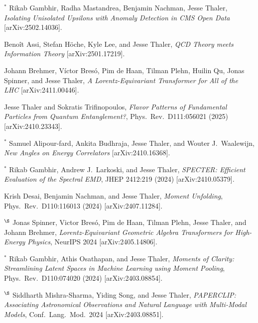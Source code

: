 \setcounter{jessecount}{137}

\begin{list}{[]\addtocounter{jessecount}{-1}}{\leftmargin=3em \itemsep=4pt}

\item
${}^\ast$ Rikab Gambhir, Radha Mastandrea, Benjamin Nachman, Jesse Thaler,
\emph{Isolating Unisolated Upsilons with Anomaly Detection in CMS Open Data}
[arXiv:2502.14036].

\item
 Benoît Assi, Stefan Höche, Kyle Lee, and Jesse Thaler,
\emph{QCD Theory meets Information Theory}
[arXiv:2501.17219].

\item
 Johann Brehmer, Víctor Bresó, Pim de Haan, Tilman Plehn, Huilin Qu, Jonas Spinner, and Jesse Thaler,
\emph{A Lorentz-Equivariant Transformer for All of the LHC}
[arXiv:2411.00446].

\item
 Jesse Thaler and Sokratis Trifinopoulos,
\emph{Flavor Patterns of Fundamental Particles from Quantum Entanglement?},
Phys.\ Rev.\ D111:056021 (2025)
[arXiv:2410.23343].

\item
${}^\ast$ Samuel Alipour-fard, Ankita Budhraja, Jesse Thaler, and Wouter J.\ Waalewijn,
\emph{New Angles on Energy Correlators}
[arXiv:2410.16368].

\item
${}^\ast$ Rikab Gambhir, Andrew J.\ Larkoski, and Jesse Thaler,
\emph{SPECTER: Efficient Evaluation of the Spectral EMD},
JHEP 2412:219 (2024)
[arXiv:2410.05379].

\item
 Krish Desai, Benjamin Nachman, and Jesse Thaler,
\emph{Moment Unfolding},
Phys.\ Rev.\ D110:116013 (2024)
[arXiv:2407.11284].

\item
${}^\S$ Jonas Spinner, Victor Bresó, Pim de Haan, Tilman Plehn, Jesse Thaler, and Johann Brehmer,
\emph{Lorentz-Equivariant Geometric Algebra Transformers for High-Energy Physics},
NeurIPS 2024
[arXiv:2405.14806].

\item
${}^\ast$ Rikab Gambhir, Athis Osathapan, and Jesse Thaler,
\emph{Moments of Clarity: Streamlining Latent Spaces in Machine Learning using Moment Pooling},
Phys.\ Rev.\ D110:074020 (2024)
[arXiv:2403.08854].

\item
${}^\S$ Siddharth Mishra-Sharma, Yiding Song, and Jesse Thaler,
\emph{PAPERCLIP: Associating Astronomical Observations and Natural Language with Multi-Modal Models},
Conf.\ Lang.\ Mod.\ 2024
[arXiv:2403.08851].


\end{list}
